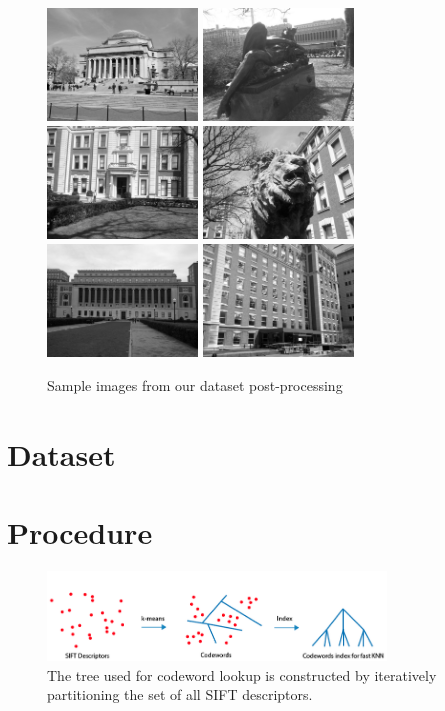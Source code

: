 \documentclass[twocolumn]{article}
\newcommand{\sectionfile}[3]{\section{#1} \label{sec:#2} }
\begin{document}
\begin{figure}
\includegraphics[width=40mm]{sample_data1.jpg}
\includegraphics[width=40mm]{sample_data2.jpg}
\includegraphics[width=40mm]{sample_data3.jpg}
\includegraphics[width=40mm]{sample_data4.jpg}
\includegraphics[width=40mm]{sample_data5.jpg}
\includegraphics[width=40mm]{sample_data6.jpg}
\caption{Sample images from our dataset post-processing}
\label{overflow}
\end{figure}
\sectionfile{Dataset}{dataset}{dataset.tex}
\sectionfile{Procedure}{procedure}{procedure.tex}
\begin{figure}
\includegraphics[width=90mm]{procedure1.png}
\caption{The tree used for codeword lookup is constructed by iteratively partitioning the set of all SIFT descriptors.}
\end{figure}
\end{document}
